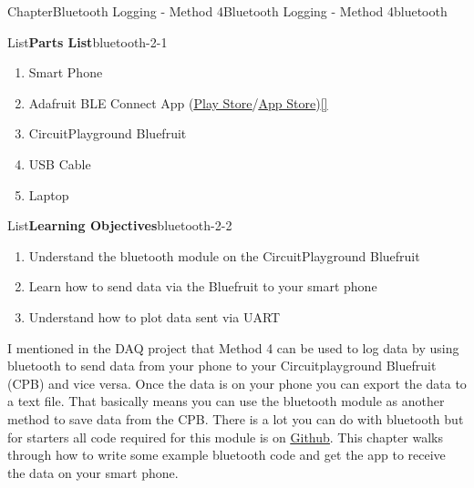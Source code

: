 \documentclass[oneside,10pt,]{book}
\newcommand{\xreffont}{\relax}
\newcommand{\linkhilite}[1]{\underline{#1}}
\numberwithin{equation}{section}
\begin{document}
%
%
\typeout{************************************************}
\typeout{************************************************}
%
\begin{chapterptx}{Chapter}{Bluetooth Logging - Method 4}{}{Bluetooth Logging - Method 4}{}{}{bluetooth}
\renewcommand*{\chaptername}{Chapter}
\begin{introduction}{}%
\begin{listptx}{List}{\textbf{Parts List}}{bluetooth-2-1}{}%
%
\begin{enumerate}
\item{}Smart Phone%
\item{}Adafruit BLE Connect App (\href{https://play.google.com/store/apps/details?id=com.adafruit.bluefruit.le.connect}{\linkhilite{Play Store}}\slash{}\href{https://apps.apple.com/us/app/bluefruit-connect/id830125974}{\linkhilite{App Store}})\hyperlink{AdafruitBLE}{\linkhilite{[{\xreffont 36}]}}%
\item{}CircuitPlayground Bluefruit%
\item{}USB Cable%
\item{}Laptop%
\end{enumerate}
\end{listptx}%
\begin{listptx}{List}{\textbf{Learning Objectives}}{bluetooth-2-2}{}%
%
\begin{enumerate}
\item{}Understand the bluetooth module on the CircuitPlayground Bluefruit%
\item{}Learn how to send data via the Bluefruit to your smart phone%
\item{}Understand how to plot data sent via UART%
\end{enumerate}
\end{listptx}%
I mentioned in the DAQ project that Method 4 can be used to log data by using bluetooth to send data from your phone to your Circuitplayground Bluefruit (CPB) and vice versa. Once the data is on your phone you can export the data to a text file. That basically means you can use the bluetooth module as another method to save data from the CPB. There is a lot you can do with bluetooth but for starters all code required for this module is on \href{https://github.com/cmontalvo251/Microcontrollers/tree/master/Circuit_Playground/CircuitPython/CPB_DataLogger}{\linkhilite{Github}}. This chapter walks through how to write some example bluetooth code and get the app to receive the data on your smart phone.%
\end{introduction}%

\end{chapterptx}
\end{document}
